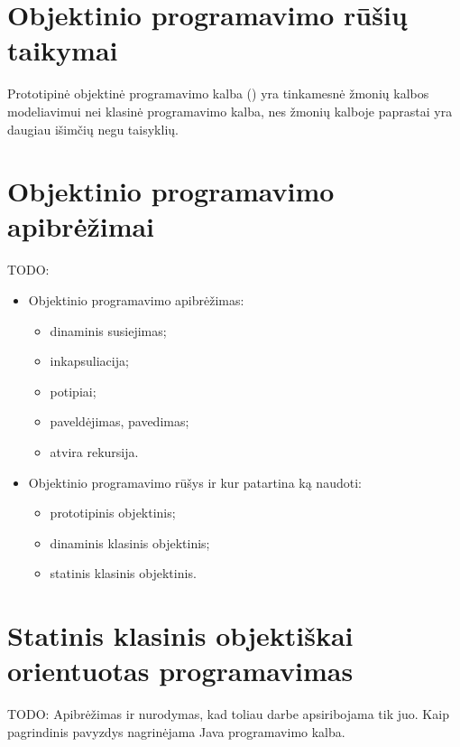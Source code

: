 \section{Objektinio programavimo rūšių taikymai}

Prototipinė objektinė programavimo kalba () yra
tinkamesnė žmonių kalbos modeliavimui nei klasinė programavimo
kalba, nes žmonių kalboje paprastai yra daugiau išimčių negu
taisyklių.

\section{Objektinio programavimo apibrėžimai}

TODO:
\begin{itemize}
  \item Objektinio programavimo apibrėžimas:
    \begin{itemize}
      \item dinaminis susiejimas;
      \item inkapsuliacija;
      \item potipiai;
      \item paveldėjimas, pavedimas;
      \item atvira rekursija.
    \end{itemize}
  \item Objektinio programavimo rūšys ir kur patartina ką naudoti:
    \begin{itemize}
      \item prototipinis objektinis;
      \item dinaminis klasinis objektinis;
      \item statinis klasinis objektinis.
    \end{itemize}
\end{itemize}

\section{Statinis klasinis objektiškai orientuotas programavimas}

TODO: Apibrėžimas ir nurodymas, kad toliau darbe apsiribojama tik juo.
Kaip pagrindinis pavyzdys nagrinėjama Java programavimo kalba.
